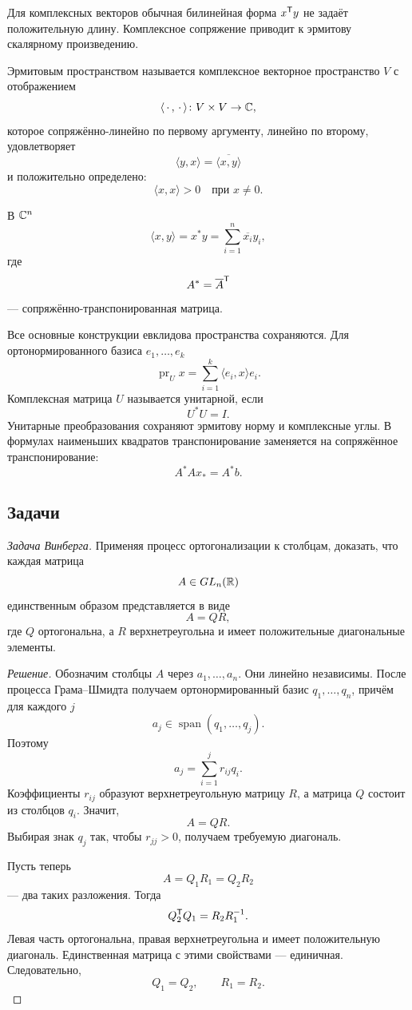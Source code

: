Для комплексных векторов обычная билинейная форма \(x^{\mathsf{T}}y\) не задаёт положительную длину. Комплексное сопряжение приводит к эрмитову скалярному произведению.

\begin{definition}
Эрмитовым пространством называется комплексное векторное пространство \(V\) с отображением
\[
\langle\,\cdot\,,\,\cdot\,\rangle\colon V\times V\to\mathbb{C},
\]
которое сопряжённо-линейно по первому аргументу, линейно по второму, удовлетворяет
\[
\langle y,x\rangle
=
\overline{\langle x,y\rangle}
\]
и положительно определено:
\[
\langle x,x\rangle>0
\quad\text{при }x\neq0.
\]
\end{definition}

В \(\mathbb{C}^n\)
\[
\langle x,y\rangle
=
x^*y
=
\sum_{i=1}^n \overline{x_i}y_i,
\]
где
\[
A^*=\overline{A}^{\mathsf{T}}
\]
--- сопряжённо-транспонированная матрица.

Все основные конструкции евклидова пространства сохраняются. Для ортонормированного базиса \(e_1,\dots,e_k\)
\[
\operatorname{pr}_U x
=
\sum_{i=1}^k
\langle e_i,x\rangle e_i.
\]
Комплексная матрица \(U\) называется унитарной, если
\[
U^*U=I.
\]
Унитарные преобразования сохраняют эрмитову норму и комплексные углы. В формулах наименьших квадратов транспонирование заменяется на сопряжённое транспонирование:
\[
A^*A x_\ast=A^*b.
\]

\subsection*{Задачи}

\begin{problem}
\textit{Задача Винберга.}
Применяя процесс ортогонализации к столбцам, доказать, что каждая матрица
\[
A\in GL_n(\mathbb{R})
\]
единственным образом представляется в виде
\[
A=QR,
\]
где \(Q\) ортогональна, а \(R\) верхнетреугольна и имеет положительные диагональные элементы.
\end{problem}

\begin{proof}[Решение]
Обозначим столбцы \(A\) через \(a_1,\dots,a_n\). Они линейно независимы. После процесса Грама--Шмидта получаем ортонормированный базис \(q_1,\dots,q_n\), причём для каждого \(j\)
\[
a_j\in\operatorname{span}(q_1,\dots,q_j).
\]
Поэтому
\[
a_j=\sum_{i=1}^j r_{ij}q_i.
\]
Коэффициенты \(r_{ij}\) образуют верхнетреугольную матрицу \(R\), а матрица \(Q\) состоит из столбцов \(q_i\). Значит,
\[
A=QR.
\]
Выбирая знак \(q_j\) так, чтобы \(r_{jj}>0\), получаем требуемую диагональ.

Пусть теперь
\[
A=Q_1R_1=Q_2R_2
\]
--- два таких разложения. Тогда
\[
Q_2^{\mathsf{T}}Q_1=R_2R_1^{-1}.
\]
Левая часть ортогональна, правая верхнетреугольна и имеет положительную диагональ. Единственная матрица с этими свойствами --- единичная. Следовательно,
\[
Q_1=Q_2,
\qquad
R_1=R_2.
\]
\end{proof}

